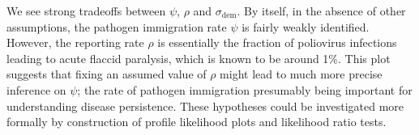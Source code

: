 \begin{frame}[fragile]

\bi

\item We see strong tradeoffs between $\psi$, $\rho$ and $\sigma_\mathrm{dem}$. By itself, in the absence of other assumptions, the pathogen immigration rate $\psi$ is fairly weakly identified. However, the reporting rate $\rho$ is essentially the fraction of poliovirus infections leading to acute flaccid paralysis, which is known to be around 1\%. This plot suggests that fixing an assumed value of $\rho$ might lead to much more precise inference on $\psi$; the rate of pathogen immigration presumably being important for understanding disease persistence. These hypotheses could be investigated more formally by construction of profile likelihood plots and likelihood ratio tests.

\ei

\end{frame}

